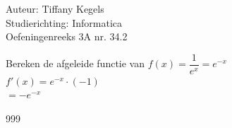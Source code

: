 \documentclass[a4paper]{article}
\begin{document}
  
\noindent \large Auteur: Tiffany Kegels \\
\noindent \large Studierichting: Informatica\\
\noindent \large Oefeningenreeks 3A nr. 34.2\\

\medskip

\normalsize

Bereken de afgeleide functie van $f(x) =  \dfrac{1}{e^x} = e^{-x}$\\

$f'(x) = e^{-x} \cdot (-1)$\\

$= -e^{-x}$

\begin{thebibliography}{999}

\end{thebibliography}
\end{document}

